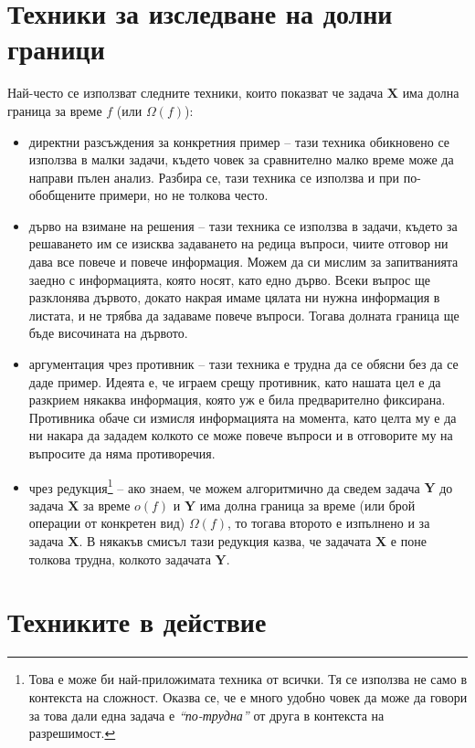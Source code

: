 \section{Техники за изследване на долни граници}

Най-често се използват следните техники, които показват че задача $\mathbf{X}$ има долна граница за време $f$ (или $\Omega(f)$):
\begin{itemize}
    \item директни разсъждения за конкретния пример -- тази техника обикновено се използва в малки задачи, където човек за сравнително малко време може да направи пълен анализ.
          Разбира се, тази техника се използва и при по-обобщените примери, но не толкова често.
    \item дърво на взимане на решения -- тази техника се използва в задачи, където за решаването им се изисква задаването на редица въпроси, чиите отговор ни дава все повече и повече информация.
          Можем да си мислим за запитванията заедно с информацията, която носят, като едно дърво.
          Всеки въпрос ще разклонява дървото, докато накрая имаме цялата ни нужна информация в листата, и не трябва да задаваме повече въпроси.
          Тогава долната граница ще бъде височината на дървото.
    \item аргументация чрез противник -- тази техника е трудна да се обясни без да се даде пример.
          Идеята е, че играем срещу противник, като нашата цел е да разкрием някаква информация, която уж е била предварително фиксирана.
          Противника обаче си измисля информацията на момента, като целта му е да ни накара да зададем колкото се може повече въпроси и в отговорите му на въпросите да няма противоречия.
    \item чрез редукция\footnote{
              Това е може би най-приложимата техника от всички.
              Тя се използва не само в контекста на сложност.
              Оказва се, че е много удобно човек да може да говори за това дали една задача е \textit{``по-трудна''} от друга в контекста на разрешимост.
          } -- ако знаем, че можем алгоритмично да сведем задача $\mathbf{Y}$ до задача $\mathbf{X}$ за време $o(f)$ и $\mathbf{Y}$ има долна граница за време (или брой операции от конкретен вид) $\Omega(f)$, то тогава второто е изпълнено и за задача $\mathbf{X}$.
          В някакъв смисъл тази редукция казва, че задачата $\mathbf{X}$ е поне толкова трудна, колкото задачата $\mathbf{Y}$.
\end{itemize}

\section{Техниките в действие}

